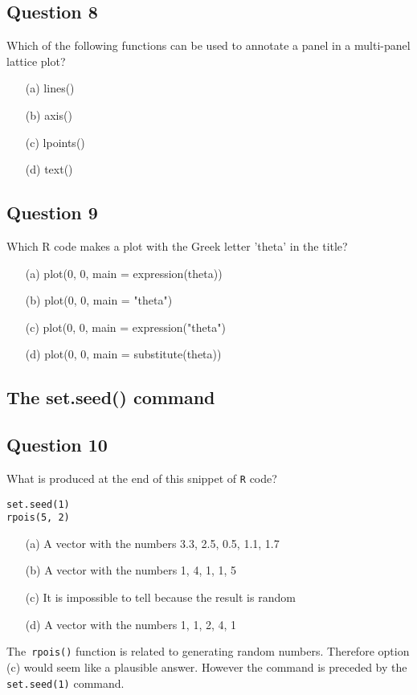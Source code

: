 \documentclass[12pt]{article}
\begin{document}
\subsection*{Question 8}
Which of the following functions can be used to annotate a panel in a multi-panel lattice plot?

\begin{itemize}
\item[(a)] lines()
\item[(b)] axis()
\item[(c)] lpoints()
\item[(d)] text()
\end{itemize}
\subsection*{Question 9}
Which R code makes a plot with the Greek letter 'theta' in the title?

\begin{itemize}
\item[(a)] plot(0, 0, main = expression(theta))
\item[(b)] plot(0, 0, main = "theta")
\item[(c)] plot(0, 0, main = expression("theta")
\item[(d)] plot(0, 0, main = substitute(theta))
\end{itemize}
\newpage

\subsection*{The set.seed() command}

\subsection*{Question 10}
What is produced at the end of this snippet of \texttt{R} code?

\begin{framed}
\begin{verbatim}
set.seed(1)
rpois(5, 2)
\end{verbatim}
\end{framed}


\begin{itemize}
\item[(a)] A vector with the numbers 3.3, 2.5, 0.5, 1.1, 1.7
\item[(b)] A vector with the numbers 1, 4, 1, 1, 5
\item[(c)] It is impossible to tell because the result is random
\item[(d)] A vector with the numbers 1, 1, 2, 4, 1
\end{itemize}

The\texttt{ rpois()} function is related to generating random numbers. Therefore option (c) would seem like a plausible answer.
However the command is preceded by the \texttt{set.seed(1)} command.
\end{document}
